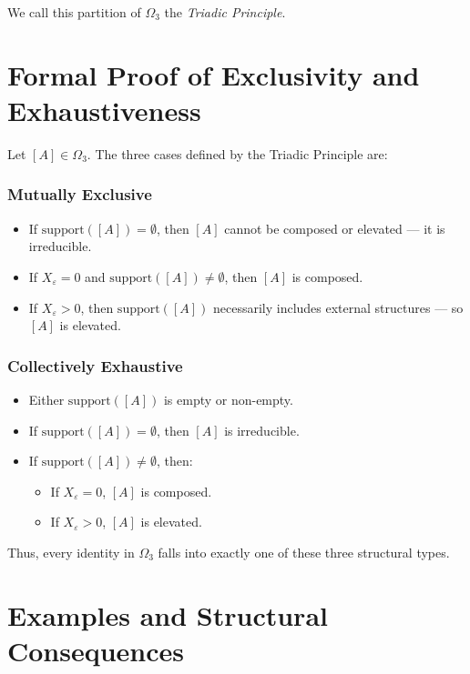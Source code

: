 We call this partition of $\Omega_3$ the \textit{Triadic Principle}.

\section{Formal Proof of Exclusivity and Exhaustiveness} \label{formal-proof-of-exclusivity-and-exhaustiveness}

Let $[A] \in \Omega_3$. The three cases defined by the Triadic Principle are:

\subsubsection*{Mutually Exclusive}

\begin{itemize}
  \item If $\text{support}([A]) = \emptyset$, then $[A]$ cannot be composed or elevated — it is irreducible.
  \item If $X_\varepsilon = 0$ and $\text{support}([A]) \ne \emptyset$, then $[A]$ is composed.
  \item If $X_\varepsilon > 0$, then $\text{support}([A])$ necessarily includes external structures — so $[A]$ is elevated.
\end{itemize}

\subsubsection*{Collectively Exhaustive}

\begin{itemize}
  \item Either $\text{support}([A])$ is empty or non-empty.
  \item If $\text{support}([A]) = \emptyset$, then $[A]$ is irreducible.
  \item If $\text{support}([A]) \ne \emptyset$, then:
  \begin{itemize}
    \item If $X_\varepsilon = 0$, $[A]$ is composed.
    \item If $X_\varepsilon > 0$, $[A]$ is elevated.
  \end{itemize}
\end{itemize}

\medskip

\noindent
Thus, every identity in $\Omega_3$ falls into exactly one of these three structural types.

\section{Examples and Structural Consequences} \label{examples-and-structural-consequences}

